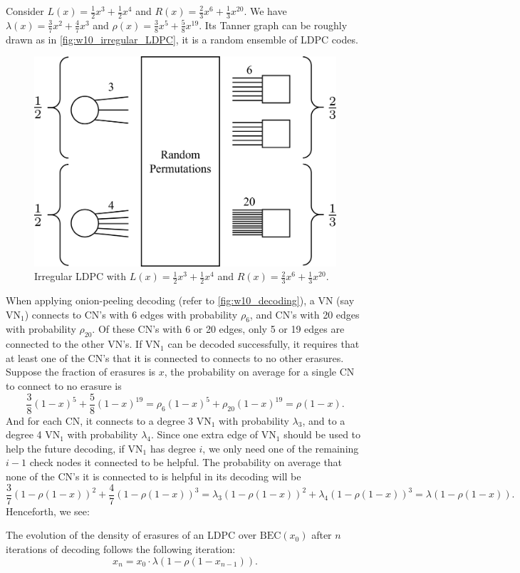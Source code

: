 Consider $L(x) = \frac{1}{2}x^3 + \frac{1}{2}x^4$ and $R(x) = \frac{2}{3}x^6 + \frac{1}{3}x^{20}$. We have $\lambda(x) = \frac{3}{7}x^2 + \frac{4}{7}x^3$ and $\rho(x) = \frac{3}{8}x^5 + \frac{5}{8}x^{19}$. Its Tanner graph can be roughly drawn as in \autoref{fig:w10_irregular_LDPC}, it is a random ensemble of LDPC codes.

\begin{figure}[h]
    \centering
    \includegraphics[width=0.5\linewidth]{figures/w10_irregular_LDPC.png}
    \caption{Irregular LDPC with $L(x) = \frac{1}{2}x^3 + \frac{1}{2}x^4$ and $R(x) = \frac{2}{3}x^6 + \frac{1}{3}x^{20}$.}
    \label{fig:w10_irregular_LDPC}
\end{figure}

When applying onion-peeling decoding (refer to \autoref{fig:w10_decoding}), a VN (say $\mathrm{VN}_1$) connects to CN's with 6 edges with probability $\rho_6$, and CN's with 20 edges with probability $\rho_{20}$. Of these CN's with 6 or 20 edges, only 5 or 19 edges are connected to the other VN's. If $\mathrm{VN}_1$ can be decoded successfully, it requires that at least one of the CN's that it is connected to connects to no other erasures. Suppose the fraction of erasures is $x$, the probability on average for a single CN to connect to no erasure is
\begin{equation*}
    \frac{3}{8}(1-x)^5 + \frac{5}{8}(1-x)^{19} = \rho_6(1-x)^5 + \rho_{20}(1-x)^{19} = \rho(1-x).
\end{equation*}
And for each CN, it connects to a degree 3 $\mathrm{VN}_1$ with probability $\lambda_3$, and to a degree 4 $\mathrm{VN}_1$ with probability $\lambda_4$. Since one extra edge of $\mathrm{VN}_1$ should be used to help the future decoding, if $\mathrm{VN}_1$ has degree $i$, we only need one of the remaining $i-1$ check nodes it connected to be helpful. The probability on average that none of the CN's it is connected to is helpful in its decoding will be
\begin{equation*}
    \frac{3}{7}(1-\rho(1-x))^2 + \frac{4}{7}(1-\rho(1-x))^3 = \lambda_3(1-\rho(1-x))^2 + \lambda_4(1-\rho(1-x))^3 = \lambda(1-\rho(1-x)).
\end{equation*}
Henceforth, we see:
\begin{theorem} \label{thm:w10_density_evolution}
    The evolution of the density of erasures of an LDPC over $\mathrm{BEC}(x_0)$ after $n$ iterations of decoding follows the following iteration:
    \begin{equation}
        x_{n} = x_0 \cdot \lambda(1-\rho(1-x_{n-1})).
    \end{equation}
\end{theorem}

